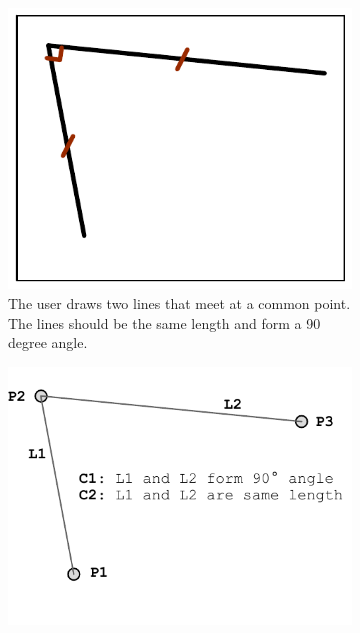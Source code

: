 \begin{figure}
  \centering

  \begin{subfigure}[t]{51mm}
    \includegraphics[width=\linewidth]{img/solving-user-intent.pdf}
    \caption{The user draws two lines that meet at a common point. The
      lines should be the same length and form a 90 degree angle.}
    \label{fig:solving-user-intent}
  \end{subfigure}
  \hspace{1mm} %
  \begin{subfigure}[t]{51mm}
    \includegraphics[width=\linewidth]{img/solving-state.pdf}

\end{subfigure}
\end{figure}
